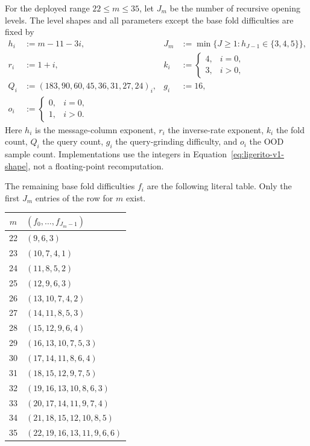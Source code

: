 For the deployed range $22\le m\le35$, let $J_m$ be the number of recursive
opening levels.  The level shapes and all parameters except the base fold
difficulties are fixed by
\begin{equation}
 \begin{aligned}
  h_i&:=m-11-3i,&
  J_m&:=\min\{J\ge1:h_{J-1}\in\{3,4,5\}\},\\
  r_i&:=1+i,&
  k_i&:=\begin{cases}4,&i=0,\\3,&i>0,\end{cases}\\
  Q_i&:=(183,90,60,45,36,31,27,24)_i,&
  g_i&:=16,\\
  o_i&:=\begin{cases}0,&i=0,\\1,&i>0.\end{cases}
 \end{aligned}
 \label{eq:ligerito-v1-shape}
\end{equation}
Here $h_i$ is the message-column exponent, $r_i$ the inverse-rate exponent,
$k_i$ the fold count, $Q_i$ the query count, $g_i$ the query-grinding
difficulty, and $o_i$ the OOD sample count.  Implementations \must{} use the
integers in Equation~\eqref{eq:ligerito-v1-shape}, not a floating-point
recomputation.

The remaining base fold difficulties $f_i$ are the following literal table.
Only the first $J_m$ entries of the row for $m$ exist.

\begingroup\footnotesize
\renewcommand{\arraystretch}{1.02}
\begin{longtable}{@{}c@{\quad}l@{}}
\toprule
$m$&$(f_0,\ldots,f_{J_m-1})$\\
\midrule
22&$(9,6,3)$\\
23&$(10,7,4,1)$\\
24&$(11,8,5,2)$\\
25&$(12,9,6,3)$\\
26&$(13,10,7,4,2)$\\
27&$(14,11,8,5,3)$\\
28&$(15,12,9,6,4)$\\
29&$(16,13,10,7,5,3)$\\
30&$(17,14,11,8,6,4)$\\
31&$(18,15,12,9,7,5)$\\
32&$(19,16,13,10,8,6,3)$\\
33&$(20,17,14,11,9,7,4)$\\
34&$(21,18,15,12,10,8,5)$\\
35&$(22,19,16,13,11,9,6,6)$\\
\bottomrule
\end{longtable}
\endgroup

